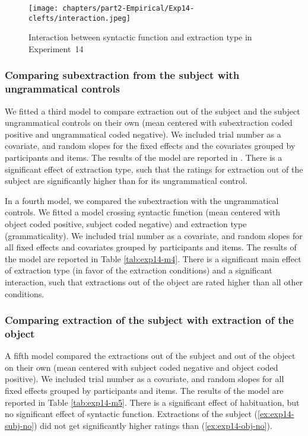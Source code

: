

\begin{figure}
    \centering
    \texttt{[image: chapters/part2-Empirical/Exp14-clefts/interaction.jpeg]}
    \caption{Interaction between syntactic function and extraction type in Experiment~14}
    \label{fig:exp14-interaction}
\end{figure}

\subsubsection{Comparing subextraction from the subject with ungrammatical controls}

We fitted a third model to compare extraction out of the subject and the subject ungrammatical controls on their own (mean centered with subextraction coded positive and ungrammatical coded negative). We included trial number as a covariate, and random slopes for the fixed effects and the covariates grouped by participants and items. The results of the model are reported in . There is a significant effect of extraction type, such that the ratings for extraction out of the subject are significantly higher than for its ungrammatical control.



In a fourth model, we compared the subextraction with the ungrammatical controls. We fitted a model crossing syntactic function (mean centered with object coded positive, subject coded negative) and extraction type (grammaticality). We included trial number as a covariate, and random slopes for all fixed effects and covariates grouped by participants and items. The results of the model are reported in Table \ref{tab:exp14-m4}. 
There is a significant main effect of extraction type (in favor of the extraction conditions) and a significant interaction, such that extractions out of the object are rated higher than all other conditions.



\subsubsection{Comparing extraction of the subject with extraction of the object}

A fifth model compared the extractions out of the subject and out of the object on their own (mean centered with subject coded negative and object coded positive). We included trial number as a covariate, and random slopes for all fixed effects grouped by participants and items. The results of the model are reported in Table \ref{tab:exp14-m5}. 
There is a significant effect of habituation, but no significant effect of syntactic function. Extractions of the subject (\ref{ex:exp14-subj-no}) did not get significantly higher ratings than (\ref{ex:exp14-obj-no}). 

